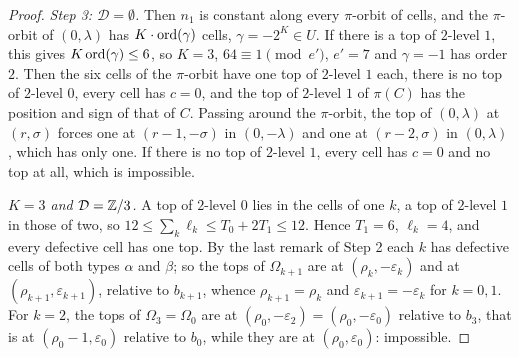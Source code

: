 \begin{proof}
\emph{Step 3: $\mathcal D=\emptyset$.} Then $n_{1}$ is constant along every
$\pi$-orbit of cells, and the $\pi$-orbit of $(0,\lambda)$ has $K\cdot
\operatorname{ord}(\gamma)$ cells, $\gamma=-2^{K}\in U$. If there is a top of $2$-level $1$,
this gives $K\operatorname{ord}(\gamma)\le6$, so $K=3$, $64\equiv1\pmod{e'}$, $e'=7$ and
$\gamma=-1$ has order $2$. Then the six cells of the $\pi$-orbit have one top
of $2$-level $1$ each, there is no top of $2$-level $0$, every cell has
$c=0$, and the top of $2$-level $1$ of $\pi(C)$ has the position and sign of
that of $C$. Passing around the $\pi$-orbit, the top of $(0,\lambda)$ at
$(r,\sigma)$ forces one at $(r-1,-\sigma)$ in $(0,-\lambda)$ and one at
$(r-2,\sigma)$ in $(0,\lambda)$, which has only one. If there is no top of
$2$-level $1$, every cell has $c=0$ and no top at all, which is impossible.

\emph{$K=3$ and $\mathcal D=\mathbb{Z}/3$.} A top of $2$-level $0$ lies in the cells
of one $k$, a top of $2$-level $1$ in those of two, so $12\le\sum_{k}\ell_{k}
\le T_{0}+2T_{1}\le12$. Hence $T_{1}=6$, $\ell_{k}=4$, and every defective
cell has one top. By the last remark of Step 2 each $k$ has defective cells
of both types $\alpha$ and $\beta$; so the tops of $\Omega_{k+1}$ are at
$(\rho_{k},-\varepsilon_{k})$ and at $(\rho_{k+1},\varepsilon_{k+1})$,
relative to $b_{k+1}$, whence $\rho_{k+1}=\rho_{k}$ and
$\varepsilon_{k+1}=-\varepsilon_{k}$ for $k=0,1$. For $k=2$, the tops of
$\Omega_{3}=\Omega_{0}$ are at $(\rho_{0},-\varepsilon_{2})=
(\rho_{0},-\varepsilon_{0})$ relative to $b_{3}$, that is at
$(\rho_{0}-1,\varepsilon_{0})$ relative to $b_{0}$, while they are at
$(\rho_{0},\varepsilon_{0})$: impossible.


\end{proof}
